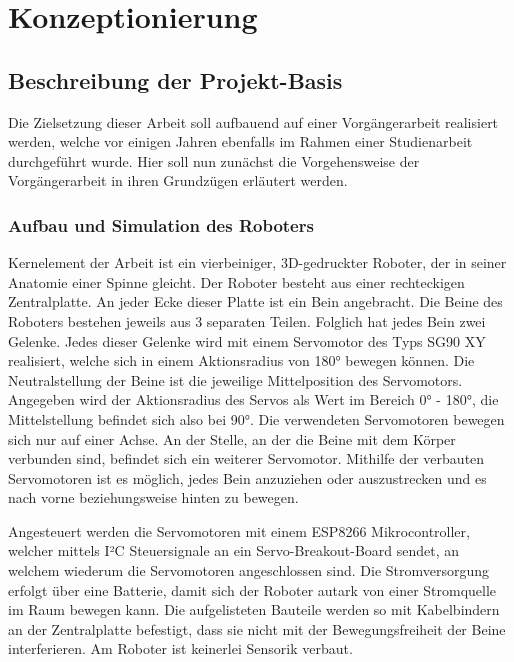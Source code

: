 \chapter{Konzeptionierung}
\section{Beschreibung der Projekt-Basis}
Die Zielsetzung dieser Arbeit soll aufbauend auf einer Vorgängerarbeit realisiert werden, welche vor einigen Jahren ebenfalls im Rahmen einer Studienarbeit durchgeführt wurde.
Hier soll nun zunächst die Vorgehensweise der Vorgängerarbeit in ihren Grundzügen erläutert werden.

\subsection{Aufbau und Simulation des Roboters}
Kernelement der Arbeit ist ein vierbeiniger, 3D-gedruckter Roboter, der in seiner Anatomie einer Spinne gleicht.
Der Roboter besteht aus einer rechteckigen Zentralplatte.
An jeder Ecke dieser Platte ist ein Bein angebracht.
Die Beine des Roboters bestehen jeweils aus 3 separaten Teilen.
Folglich hat jedes Bein zwei Gelenke. \cite[52]{waidner.2020}
Jedes dieser Gelenke wird mit einem Servomotor des Typs SG90 XY realisiert, welche sich in einem Aktionsradius von 180° bewegen können.
Die Neutralstellung der Beine ist die jeweilige Mittelposition des Servomotors.
Angegeben wird der Aktionsradius des Servos als Wert im Bereich 0° - 180°, die Mittelstellung befindet sich also bei 90°. \cite[38]{waidner.2020}
Die verwendeten Servomotoren bewegen sich nur auf einer Achse.
An der Stelle, an der die Beine mit dem Körper verbunden sind, befindet sich ein weiterer Servomotor.
Mithilfe der verbauten Servomotoren ist es möglich, jedes Bein anzuziehen oder auszustrecken und es nach vorne beziehungsweise hinten zu bewegen.

Angesteuert werden die Servomotoren mit einem ESP8266 Mikrocontroller, welcher mittels I²C Steuersignale an ein Servo-Breakout-Board sendet, an welchem wiederum die Servomotoren angeschlossen sind.
Die Stromversorgung erfolgt über eine Batterie, damit sich der Roboter autark von einer Stromquelle im Raum bewegen kann. \cite[54]{waidner.2020}
Die aufgelisteten Bauteile werden so mit Kabelbindern an der Zentralplatte befestigt, dass sie nicht mit der Bewegungsfreiheit der Beine interferieren.
Am Roboter ist keinerlei Sensorik verbaut. \cite[36]{waidner.2020}

